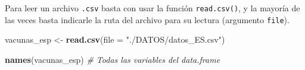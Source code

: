 \documentclass[11pt,]{book}
\newenvironment{Shaded}{\begin{snugshade}}{\end{snugshade}}
\newcommand{\CommentTok}[1]{\textcolor[rgb]{0.37,0.37,0.37}{\textit{#1}}}
\newcommand{\DataTypeTok}[1]{\textcolor[rgb]{0.27,0.27,0.27}{#1}}
\newcommand{\KeywordTok}[1]{\textcolor[rgb]{0.27,0.27,0.27}{\textbf{#1}}}
\newcommand{\NormalTok}[1]{#1}
\newcommand{\StringTok}[1]{\textcolor[rgb]{0.5,0.5,0.5}{#1}}
\begin{document}
Para leer un archivo \texttt{.csv} basta con usar la función \texttt{read.csv()}, y la mayoría de las veces basta indicarle la ruta del archivo para su lectura (argumento \texttt{file}).

\begin{Shaded}
\begin{Highlighting}[]
\NormalTok{vacunas_esp <-}\StringTok{ }\KeywordTok{read.csv}\NormalTok{(}\DataTypeTok{file =} \StringTok{"./DATOS/datos_ES.csv"}\NormalTok{)}
\end{Highlighting}
\end{Shaded}

\begin{Shaded}
\begin{Highlighting}[]
\KeywordTok{names}\NormalTok{(vacunas_esp) }\CommentTok{# Todas las variables del data.frame}
\end{Highlighting}
\end{Shaded}
\end{document}
